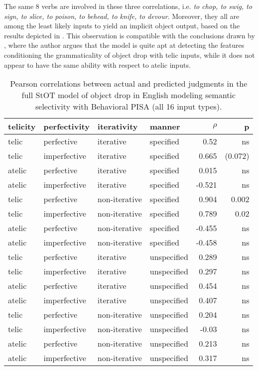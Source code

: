 The same 8 verbs are involved in these three correlations, i.e. \textit{to chop, to swig, to sign, to slice, to poison, to behead, to knife, to devour}. Moreover, they all are among the least likely inputs to yield an implicit object output, based on the results depicted in . This observation is compatible with the conclusions drawn by \textcite[150-152]{Medina2007}, where the author argues that the model is quite apt at detecting the features conditioning the grammaticality of object drop with telic inputs, while it does not appear to have the same ability with respect to atelic inputs.

\begin{table}[htb] %
\caption{Pearson correlations between actual and predicted judgments in the full StOT model of object drop in English modeling semantic selectivity with Behavioral PISA (all 16 input types).}
\begin{tabular}{llll|rr}
\textbf{telicity} & \textbf{perfectivity} & \textbf{iterativity} & \textbf{manner} & \textbf{$\rho$} & \textbf{p} \\
\hline
telic & perfective & iterative & specified              & 0.52 & ns \\
telic & imperfective & iterative & specified                  & 0.665 & (0.072) \\
atelic & perfective & iterative & specified             & 0.015 & ns \\
atelic & imperfective & iterative & specified                 & -0.521 & ns \\
telic & perfective & non-iterative & specified          & 0.904 & 0.002 \\
telic & imperfective & non-iterative & specified              & 0.789 & 0.02 \\
atelic & perfective & non-iterative & specified         & -0.455 & ns \\
atelic & imperfective & non-iterative & specified             & -0.458 & ns \\
telic & perfective & iterative & unspecified            & 0.289 & ns \\
telic & imperfective & iterative & unspecified                & 0.297 & ns \\
atelic & perfective & iterative & unspecified           & 0.454 & ns \\
atelic & imperfective & iterative & unspecified               & 0.407 & ns \\
telic & perfective & non-iterative & unspecified        & 0.204 & ns \\
telic & imperfective & non-iterative & unspecified            & -0.03 & ns \\
atelic & perfective & non-iterative & unspecified             & 0.213 & ns \\
atelic & imperfective & non-iterative & unspecified       & 0.317 & ns \\
\end{tabular}
\end{table}

